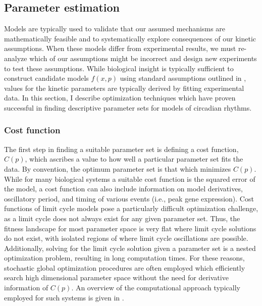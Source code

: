 \subsection{Parameter estimation}

Models are typically used to validate that our assumed mechanisms are mathematically feasible and to systematically explore consequences of our kinetic assumptions.
When these models differ from experimental results, we must re-analyze which of our assumptions might be incorrect and design new experiments to test these assumptions.
While biological insight is typically sufficient to construct candidate models $f(x, p)$ using standard assumptions outlined in , values for the kinetic parameters are typically derived by fitting experimental data.
In this section, I describe optimization techniques which have proven successful in finding descriptive parameter sets for models of circadian rhythms.

\subsubsection{Cost function}

The first step in finding a suitable parameter set is defining a cost function, $C(p)$, which ascribes a value to how well a particular parameter set fits the data.
By convention, the optimum parameter set is that which minimizes $C(p)$.
While for many biological systems a suitable cost function is the squared error of the model, a cost function can also include information on model derivatives, oscillatory period, and timing of various events (i.e., peak gene expression).
Cost functions of limit cycle models pose a particularly difficult optimization challenge, as a limit cycle does not always exist for any given parameter set.
Thus, the fitness landscape for most parameter space is very flat where limit cycle solutions do not exist, with isolated regions of  where limit cycle oscillations are possible.
Additionally, solving for the limit cycle solution given a parameter set is a nested optimization problem, resulting in long computation times.
For these reasons, stochastic global optimization procedures are often employed which efficiently search high dimensional parameter space without the need for derivative information of $C(p)$.
An overview of the computational approach typically employed for such systems is given in .

